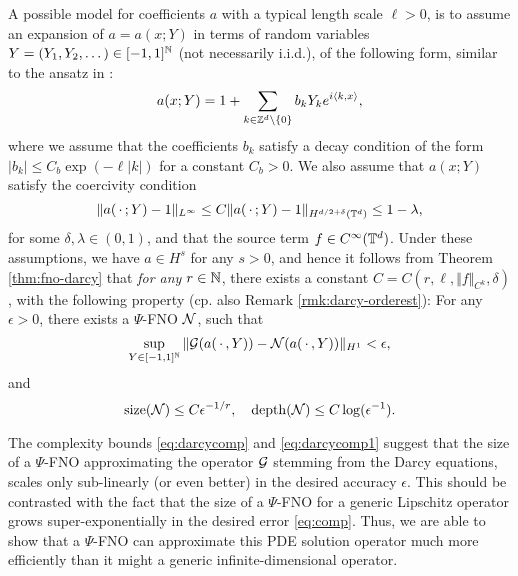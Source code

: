 \documentclass[reqno,a4paper]{amsart}
\begin{document}
\begin{example}
A possible model for coefficients $a$ with a typical length scale $\ell > 0$, is to assume an expansion of $a = a(x;Y)$ in terms of random variables $Y = (Y_1,Y_2,\dots) \in [-1,1]^{\mathbb{N}}$ (not necessarily i.i.d.), of the following form, similar to the ansatz in \cite{SchwabZech2019}:
\[
a(x;Y) = 1 + \sum_{k\in \mathbb{Z}^d\setminus \{0\}} b_k Y_k e^{i\langle k, x\rangle},
\]
where we assume that the coefficients $b_k$ satisfy a decay condition of the form $|b_k| \le C_b\exp(-\ell|k|)$ for a constant $C_b > 0$. We also assume that $a(x;Y)$ satisfy the coercivity condition 
\[
\Vert a({\,\cdot\,}; Y) - 1\Vert_{L^\infty} 
\le C \Vert a({\,\cdot\,}; Y) - 1 \Vert_{H^{d/2+\delta}(\mathbb{T}^d)}
\le 1-\lambda,
\]
for some $\delta, \lambda \in (0,1)$, and that the source term $f\in C^\infty(\mathbb{T}^d)$. Under these assumptions, we have $a\in H^s$ for any $s > 0$, and hence it follows from Theorem \ref{thm:fno-darcy} that \emph{for any $r \in \mathbb{N}$}, there exists a constant $C = C(r,\ell, \Vert f \Vert_{C^k}, \delta)$, with the following property (cp. also Remark \ref{rmk:darcy-orderest}): For any $\epsilon > 0$, there exists a $\Psi$-FNO $\mathcal{N}$, such that 
\[
\sup_{Y\in [-1,1]^{\mathbb{N}}} \Vert \mathcal{G}(a({\,\cdot\,}, Y)) - \mathcal{N}(a({\,\cdot\,},Y)) \Vert_{H^1} < \epsilon,
\]
and 
\begin{equation}
    \label{eq:darcycomp1}
\mathrm{size}(\mathcal{N}) \le C\epsilon^{-1/r}, 
\quad
\mathrm{depth}(\mathcal{N}) \le C\log(\epsilon^{-1}).
\end{equation}
\end{example}
The complexity bounds \eqref{eq:darcycomp} and \eqref{eq:darcycomp1} suggest that the size of a $\Psi$-FNO approximating the operator $\mathcal{G}$ stemming from the Darcy equations, scales only sub-linearly (or even better) in the desired accuracy $\epsilon$. This should be contrasted with the fact that the size of a $\Psi$-FNO for a generic Lipschitz operator grows super-exponentially in the desired error \eqref{eq:comp}. Thus, we are able to show that a $\Psi$-FNO can approximate this PDE solution operator much more efficiently than it might a generic infinite-dimensional operator. 
\end{document}
